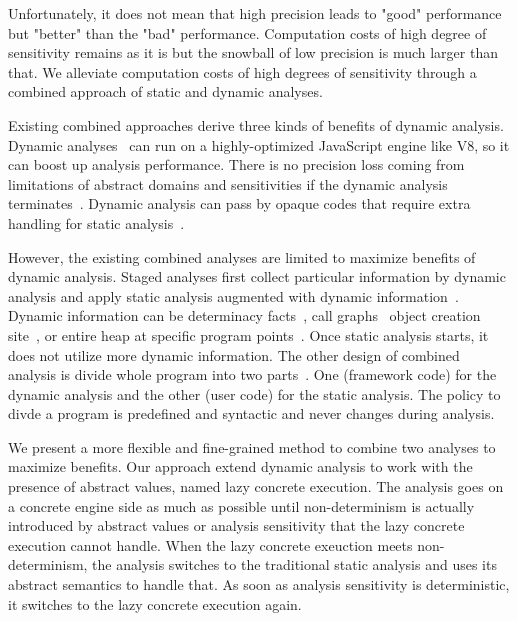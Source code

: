 Unfortunately, it does not mean that high precision leads to "good" performance
but "better" than the "bad" performance.
Computation costs of high degree of sensitivity remains as it is but the
snowball of low precision is much larger than that.
We alleviate computation costs of high degrees of sensitivity through a combined
approach of static and dynamic analyses.


Existing combined approaches derive three kinds of benefits of dynamic analysis.
Dynamic analyses~\cite{jalangi, dlint} can run on a highly-optimized
JavaScript engine like V8, so it can boost up analysis performance.
There is no precision loss coming from limitations of abstract domains and
sensitivities if the dynamic analysis terminates~\cite{determinacy, concerto}.
Dynamic analysis can pass by opaque codes that require extra handling for static
analysis~\cite{battles, sra}.

However, the existing combined analyses are limited to maximize benefits of
dynamic analysis.
Staged analyses first collect particular information by dynamic analysis and
apply static analysis augmented with dynamic information~\cite{blendedJava, eha}.
Dynamic information can be determinacy facts~\cite{determinacy}, call graphs~\cite{tunable}
object creation site~\cite{blendedJS}, or entire heap at specific program points~\cite{battles}.
Once static analysis starts, it does not utilize more dynamic information.
The other design of combined analysis is divide whole program into two parts~\cite{concerto}.
One (framework code) for the dynamic analysis  and the other (user code) for the
static analysis.
The policy to divde a program is predefined and syntactic and never changes
during analysis.


We present a more flexible and fine-grained method to combine two analyses to
maximize benefits.
Our approach extend dynamic analysis to work with the presence of abstract
values, named lazy concrete execution.
The analysis goes on a concrete engine side as much as possible until
non-determinism is actually introduced by abstract values or analysis
sensitivity that the lazy concrete execution cannot handle.
When the lazy concrete exeuction meets non-determinism, the analysis switches to
the traditional static analysis and uses its abstract semantics to handle that.
As soon as analysis sensitivity is deterministic, it switches to the lazy
concrete execution again.


